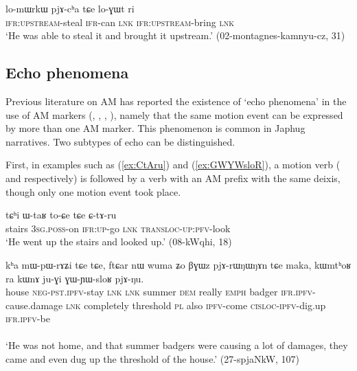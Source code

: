 \begin{exe}
\ex \label{ex:lomWrkW}
 \gll lo-mɯrkɯ pjɤ-cʰa tɕe lo-ɣɯt ri \\
 \textsc{ifr}:\textsc{upstream}-steal \textsc{ifr}-can \textsc{lnk} \textsc{ifr}:\textsc{upstream}-bring \textsc{lnk} \\
\glt `He was able to steal it and brought it upstream.' (02-montagnes-kamnyu-cz, 31)
\end{exe}

\subsection{Echo phenomena} \label{sec:AM.echo}
Previous literature on AM has reported the existence of `echo phenomena' in the use of AM markers (\citealt[251]{wilkins91associated.motion}, \citealt[681-683]{vuillermet12eseejja}, \citealt[128-130]{rose15am}, \citealt[11]{guillaume16am}), namely that the same motion event can be expressed by more than one AM marker. This phenomenon is common in Japhug narratives. Two subtypes of echo can be distinguished.

First, in examples such as (\ref{ex:CtAru}) and (\ref{ex:GWYWsloR}), a motion verb ( and  respectively) is followed by a verb with an AM prefix with the same deixis, though only one motion event took place.

\begin{exe}
\ex \label{ex:CtAru}
\gll tɕʰi ɯ-taʁ to-ɕe tɕe ɕ-tɤ-ru   \\
stairs \textsc{3sg}.\textsc{poss}-on \textsc{ifr}:\textsc{up}-go \textsc{lnk}  \textsc{transloc}-\textsc{up}:\textsc{pfv}-look \\
\glt `He went up the stairs and looked up.'  (08-kWqhi, 18)
\end{exe}

\begin{exe}
\ex \label{ex:GWYWsloR}
\gll kʰa mɯ-pɯ-rɤʑi tɕe tɕe, ftɕar nɯ wuma ʑo βɣɯz pjɤ-rɯŋɯŋɤn tɕe maka,
kɯmtʰoʁ ra kɯnɤ ju-ɣi ɣɯ-ɲɯ-sloʁ pjɤ-ŋu. \\
house \textsc{neg}-\textsc{pst}.\textsc{ipfv}-stay \textsc{lnk} \textsc{lnk} summer \textsc{dem} really \textsc{emph} badger \textsc{ifr}.\textsc{ipfv}-cause.damage \textsc{lnk} completely threshold \textsc{pl} also \textsc{ipfv}-come \textsc{cisloc}-\textsc{ipfv}-dig.up \textsc{ifr}.\textsc{ipfv}-be \\
 \\
\glt `He was not home, and that summer badgers were causing a lot of damages, they came and even dug up  the threshold of the house.'  (27-spjaNkW, 107)
\end{exe}

